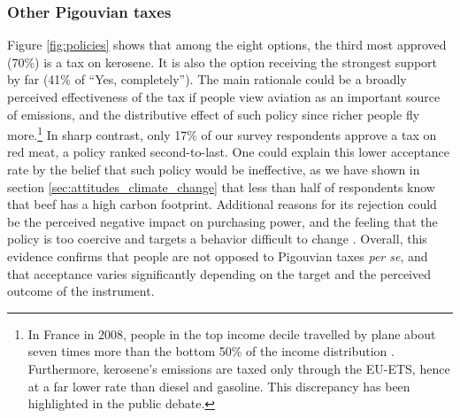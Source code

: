 \documentclass[english,5p,authoryear]{elsarticle}
\begin{document}
        \subsubsection{Other Pigouvian taxes}

Figure \ref{fig:policies} shows that among the eight options, the third most approved (70\%) is a tax on kerosene. It is also the option receiving the strongest support by far (41\% of ``Yes, completely''). The main rationale could be a broadly perceived effectiveness of the tax if people view aviation as an important source of emissions, and the distributive effect of such policy since richer people fly more.\footnote{In France in 2008, people in the top income decile travelled by plane about seven times more than the bottom 50\% of the income distribution \citep{pappalardo_mobilite_2010}. Furthermore, kerosene's emissions are taxed only through the EU-ETS, hence at a far lower rate than diesel and gasoline. This discrepancy has been highlighted in the public debate.} In sharp contrast, only 17\% of our survey respondents approve a tax on red meat, a policy ranked second-to-last. One could explain this lower acceptance rate by the belief that such policy would be ineffective, as we have shown in section \ref{sec:attitudes_climate_change} that less than half of respondents know that beef has a high carbon footprint. Additional reasons for its rejection could be the perceived negative impact on purchasing power, and the feeling that the policy is too coercive and targets a behavior difficult to change \citep{de_groot_schuitema_2012}. Overall, this evidence confirms that people are not opposed to Pigouvian taxes \textit{per se}, and that acceptance varies significantly depending on the target and the perceived outcome of the instrument.
\end{document}

